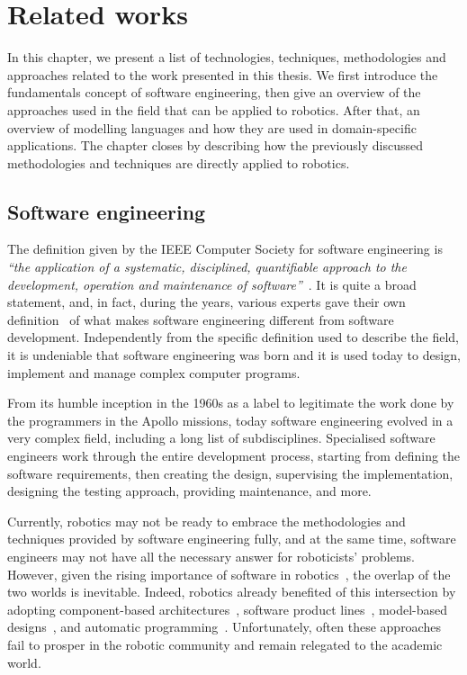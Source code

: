 \chapter[Related works]{Related works}\label{ch:Related}

In this chapter, we present a list of technologies, techniques, methodologies and approaches related to the work presented in this thesis. We first introduce the fundamentals concept of software engineering, then give an overview of the approaches used in the field that can be applied to robotics. After that, an overview of modelling languages and how they are used in domain-specific applications. The chapter closes by describing how the previously discussed methodologies and techniques are directly applied to robotics.

\minitoc
\newpage

\section{Software engineering}
The definition given by the IEEE Computer Society for software engineering is \textit{``the application of a systematic, disciplined, quantifiable approach to the development, operation and maintenance of software''}~\cite{abran2004software}. It is quite a broad statement, and, in fact, during the years, various experts gave their own definition~\cite{sommerville2011software, ieee1990ieee, pressman2005software} of what makes software engineering different from software development. Independently from the specific definition used to describe the field, it is undeniable that software engineering was born and it is used today to design, implement and manage complex computer programs.

From its humble inception in the 1960s as a label to legitimate the work done by the programmers in the Apollo missions, today software engineering evolved in a very complex field, including a long list of subdisciplines. Specialised software engineers work through the entire development process, starting from defining the software requirements, then creating the design, supervising the implementation, designing the testing approach, providing maintenance, and more.

Currently, robotics may not be ready to embrace the methodologies and techniques provided by software engineering fully, and at the same time, software engineers may not have all the necessary answer for roboticists' problems. However, given the rising importance of software in robotics~\cite{cousins2011exponential}, the overlap of the two worlds is inevitable. Indeed, robotics already benefited of this intersection by adopting component-based architectures~\cite{quigley2009ros, schlegel2014smartmdsd}, software product lines~\cite{gherardi2014modeling}, model-based designs~\cite{diego2010v3cmm}, and automatic programming~\cite{kumar2016rosmod}. Unfortunately, often these approaches fail to prosper in the robotic community and remain relegated to the academic world.

